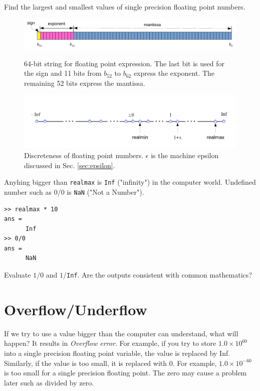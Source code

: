 \noindent
\exercise\label{ex:minmaxfloat}
Find the largest and smallest values of single precision floating point numbers.
\vspace{18px}

\begin{figure}[tb]
\centering
\includegraphics[width=5.5in]{01.numbers/double-float.pdf}\label{fig:double-float}
\caption{64-bit string for floating point expression.  The last bit is used for the sign and 11 bits from $b_{52}$ to $b_{62}$ express the exponent.  The remaining 52 bits express the mantissa.}
\end{figure}

\begin{figure}[tb]
\centering
\includegraphics{01.numbers/floating-point-line.pdf}
\caption{Discreteness of floating point numbers. $\epsilon$ is the machine epsilon discussed in Sec. \ref{sec:epsilon}.}
\label{fig:machine_epsilon}
\end{figure}

\begin{example}\label{ex:InfNaN}
	
Anyhing bigger than \texttt{realmax} is \texttt{Inf} ("infinity") in the computer world.  Undefined number such as 0/0 is \texttt{NaN} ("Not a Number").
\small
\begin{mybox}
	\begin{verbatim}
>> realmax * 10
ans =
      Inf    
>> 0/0
ans =
      NaN
\end{verbatim}
\end{mybox}
\normalsize
\end{example}

\noindent
\exercise
Evaluate $1/0$ and $1/$\texttt{Inf}.  Are the outputs consistent with common mathematics?
\vspace{18px}

\noindent
\section{Overflow/Underflow}\label{sec:overflow}
If we try to use a value bigger than the computer can understand, what will happen? 
It results in \emph{Overflow error}.  For example, if you try to store $1.0 \times 10^{60}$ into a single precision floating point variable, the value is replaced by Inf.  Similarly, if the value is too small, it is replaced with 0.  For example, $1.0 \times  10^{-60}$ is too small for a single precision floating point. The zero may cause a problem later such as divided by zero.

